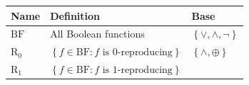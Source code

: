 \documentclass[10pt,a4paper]{article}
\newcommand{\set}[1]{\left\{#1\right\}}
\newcommand{\xor}{\oplus}
\newcommand{\clonefont}[1]{\mathrm{#1}}
\begin{document}
\begin{figure}[hbtp]
    \centering
    \begin{small}
        \begin{longtable}[]{p{}p{}p{}}
            \toprule
            \begin{minipage}[b]{0.12\columnwidth}\raggedright
                Name\strut
            \end{minipage} & \begin{minipage}[b]{0.41\columnwidth}\raggedright
                Definition\strut
            \end{minipage} & \begin{minipage}[b]{0.38\columnwidth}\raggedright
                Base\strut
            \end{minipage}\tabularnewline
            \midrule
            \endhead
            \begin{minipage}[t]{0.12\columnwidth}\raggedright
                \(\mathrm{BF}\)\strut
            \end{minipage} & \begin{minipage}[t]{0.41\columnwidth}\raggedright
                All Boolean functions\strut
            \end{minipage} & \begin{minipage}[t]{0.38\columnwidth}\raggedright
                \(\set{\lor,\land,\neg}\)\strut
            \end{minipage}\tabularnewline
            \begin{minipage}[t]{0.12\columnwidth}\raggedright
                \(\clonefont{R_0}\)\strut
            \end{minipage} & \begin{minipage}[t]{0.41\columnwidth}\raggedright
                \(\set{f \in \clonefont{BF} : f \text{ is $0$-reproducing}}\)\strut
            \end{minipage} & \begin{minipage}[t]{0.38\columnwidth}\raggedright
                \(\set{\land,\xor}\)\strut
            \end{minipage}\tabularnewline
            \begin{minipage}[t]{0.12\columnwidth}\raggedright
                \(\clonefont{R_1}\)\strut
            \end{minipage} & \begin{minipage}[t]{0.41\columnwidth}\raggedright
                \(\set{f \in \clonefont{BF} : f \text{ is $1$-reproducing}}\)\strut
            \end{minipage} & \begin{minipage}[t]{0.38\columnwidth}\raggedright

\end{minipage}
\end{longtable}
\end{small}
\end{figure}
\end{document}
